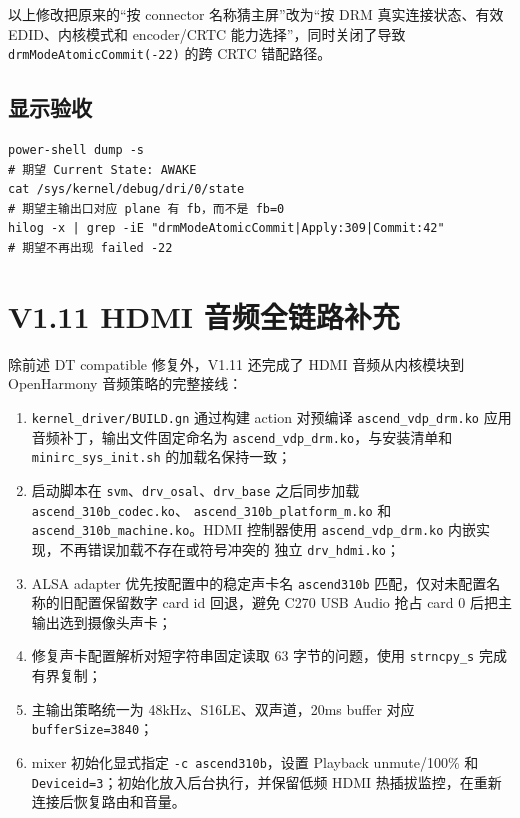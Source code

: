 以上修改把原来的“按 connector 名称猜主屏”改为“按 DRM 真实连接状态、有效
EDID、内核模式和 encoder/CRTC 能力选择”，同时关闭了导致
\texttt{drmModeAtomicCommit(-22)} 的跨 CRTC 错配路径。

\subsection{显示验收}

\begin{lstlisting}[style=shell]
power-shell dump -s
# 期望 Current State: AWAKE
cat /sys/kernel/debug/dri/0/state
# 期望主输出口对应 plane 有 fb，而不是 fb=0
hilog -x | grep -iE "drmModeAtomicCommit|Apply:309|Commit:42"
# 期望不再出现 failed -22
\end{lstlisting}

\section{V1.11 HDMI 音频全链路补充}

除前述 DT compatible 修复外，V1.11 还完成了 HDMI 音频从内核模块到
OpenHarmony 音频策略的完整接线：

\begin{enumerate}
  \item \texttt{kernel\_driver/BUILD.gn} 通过构建 action 对预编译
  \texttt{ascend\_vdp\_drm.ko} 应用音频补丁，输出文件固定命名为
  \texttt{ascend\_vdp\_drm.ko}，与安装清单和
  \texttt{minirc\_sys\_init.sh} 的加载名保持一致；
  \item 启动脚本在 \texttt{svm}、\texttt{drv\_osal}、\texttt{drv\_base}
  之后同步加载 \texttt{ascend\_310b\_codec.ko}、
  \texttt{ascend\_310b\_platform\_m.ko} 和
  \texttt{ascend\_310b\_machine.ko}。HDMI 控制器使用
  \texttt{ascend\_vdp\_drm.ko} 内嵌实现，不再错误加载不存在或符号冲突的
  独立 \texttt{drv\_hdmi.ko}；
  \item ALSA adapter 优先按配置中的稳定声卡名 \texttt{ascend310b}
  匹配，仅对未配置名称的旧配置保留数字 card id 回退，避免 C270 USB Audio
  抢占 card 0 后把主输出选到摄像头声卡；
  \item 修复声卡配置解析对短字符串固定读取 63 字节的问题，使用
  \texttt{strncpy\_s} 完成有界复制；
  \item 主输出策略统一为 48kHz、S16LE、双声道，20ms buffer 对应
  \texttt{bufferSize=3840}；
  \item mixer 初始化显式指定 \texttt{-c ascend310b}，设置 Playback
  unmute/100\% 和 \texttt{Deviceid=3}；初始化放入后台执行，并保留低频 HDMI
  热插拔监控，在重新连接后恢复路由和音量。
\end{enumerate}

